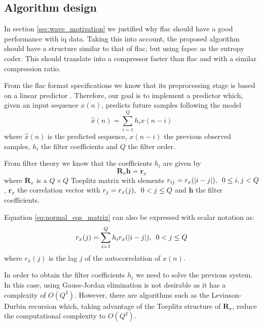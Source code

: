 \subsection{Algorithm design}
In section \ref{sec:wave_motivation} we justified why \acrshort{flac} should have a good performance with \acrshort{iq} data. Taking this into account, the proposed algorithm should have a structure similar to that of \acrshort{flac}, but using \acrshort{fapec} as the entropy coder. This should translate into a compressor faster than \acrshort{flac} and with a similar compression ratio.

From the \acrshort{flac} format specifications we know that its preprocessing stage is based on a linear predictor \parencite{FLAC}. Therefore, our goal is to implement a predictor which, given an input sequence $x(n)$, predicts future samples following the model
\begin{equation} \label{eq:prediction_x}
\hat{x}(n) = \sum_{i=1}^{Q} h_i x(n-i)
\end{equation}
where $\hat{x}(n)$ is the predicted sequence, $x(n-i)$ the previous observed samples, $h_i$ the filter coefficients and $Q$ the filter order.

From filter theory \parencite{PSAVC} we know that the coefficients $h_i$ are given by
\begin{equation} \label{eq:normal_eqs_matrix}
\mathbf{R}_x \mathbf{h} = \mathbf{r}_x
\end{equation}
where $\mathbf{R}_x$ is a $Q \times Q$ Toeplitz matrix with elements $r_{ij} = r_x(|i-j|),\hspace{0.5em} 0 \leq i,j < Q$, $\mathbf{r}_x$ the correlation vector with $r_j = r_x(j),\hspace{0.5em} 0 < j \leq Q$ and $\mathbf{h}$ the filter coefficients.

Equation \ref{eq:normal_eqs_matrix} can also be expressed with scalar notation as:
\begin{equation} \label{eq:normal_equations}
r_x(j) = \sum_{i=1}^{Q} h_i r_x(|i-j|) ,\hspace{0.5em} 0 < j \leq Q
\end{equation}
where $r_x(j)$ is the lag $j$ of the autocorrelation of $x(n)$.

In order to obtain the filter coefficients $h_i$ we need to solve the previous system. In this case, using Gauss-Jordan elimination is not desirable as it has a complexity of $O(Q^3)$. However, there are algorithms such as the Levinson-Durbin recursion \parencite{LevinsonDurbin} which, taking advantage of the Toeplitz structure of $\mathbf{R}_x$, reduce the computational complexity to $O(Q^2)$.

